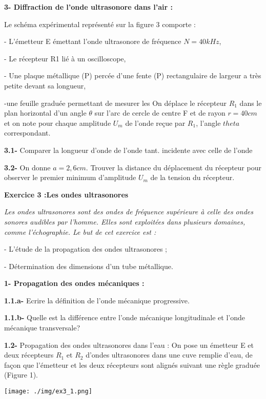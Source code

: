 \documentclass[12pt, french]{article}
\begin{document}
\textbf{3- Diffraction de l'onde ultrasonore dans l’air :\dotfill}

Le schéma expérimental représenté sur la figure 3 comporte :

- L'émetteur E émettant l'onde ultrasonore de fréquence $N =40kHz$,

- Le récepteur R1 lié à un oscilloscope,

- Une plaque métallique (P) percée d'une fente (P) rectangulaire de largeur a très petite devant sa longueur,

-une feuille graduée permettant de mesurer les On déplace le récepteur $R_1$ dans le plan horizontal
d'un angle $\theta$ sur l'arc de cercle de centre F et de rayon $r = 40 cm$ et on note pour chaque
amplitude $U_m$ de l'onde reçue par $R_1$, l'angle $theta$ correspondant.

\textbf{3.1- }Comparer la longueur d'onde de l'onde tant. incidente avec celle de l'onde

\textbf{3.2- }On donne $a = 2,6 cm$. Trouver la distance du déplacement du récepteur pour observer le premier minimum d'amplitude $U_m$ de la tension du récepteur.


\begin{tcolorbox}\textbf{Exercice 3 :Les ondes ultrasonores }
\end{tcolorbox}
\emph{Les ondes ultrasonores sont des ondes de fréquence supérieure à celle des ondes sonores audibles par
l’homme. Elles sont exploitées dans plusieurs domaines, comme l’échographie.
Le but de cet exercice est :}

- L’étude de la propagation des ondes ultrasonores ;

- Détermination des dimensions d’un tube métallique.

\textbf{1- Propagation des ondes mécaniques :\dotfill}

\textbf{1.1.a- }Ecrire la définition de l’onde mécanique progressive.

\textbf{1.1.b- }Quelle est la différence entre l’onde mécanique longitudinale et l’onde mécanique transversale?

\textbf{1.2- }Propagation des ondes ultrasonores dans l’eau :
On pose un émetteur E et deux récepteurs $R_1$ et $R_2$ d’ondes ultrasonores dans une cuve remplie d’eau, de façon que l’émetteur et les deux récepteurs sont alignés suivant une règle graduée (Figure 1).

\begin{center}
	  \vspace{-0.5cm}
	\texttt{[image: ./img/ex3\_1.png]}
  \end{center}
\end{document}
